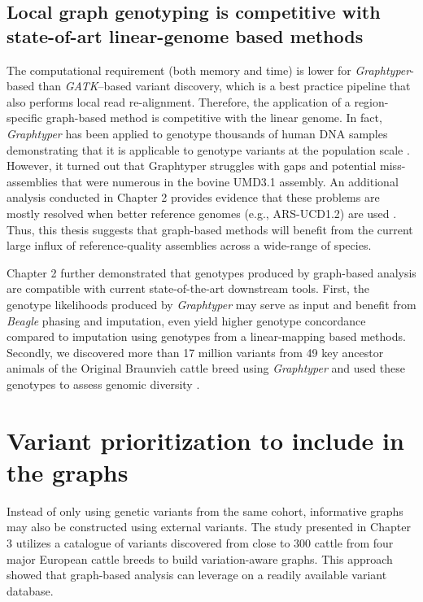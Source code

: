 \documentclass[../main.tex]{subfiles}
\begin{document}
\subsection*{Local graph genotyping is competitive with state-of-art linear-genome based methods}

The computational requirement (both memory and time) is lower for \emph{Graphtyper}-based than \emph{GATK}–based variant discovery, which is a best practice pipeline that also performs local read re-alignment. Therefore, the application of a region-specific graph-based method is competitive with the linear genome. In fact, \emph{Graphtyper} has been applied to genotype thousands of human DNA samples demonstrating that it is applicable to genotype variants at the population scale \citep{eggertsson2017graphtyper,eggertsson2019graphtyper2}. However, it turned out that Graphtyper struggles with gaps and potential miss-assemblies that were numerous in the bovine UMD3.1 assembly. An additional analysis conducted in Chapter 2 provides evidence that these problems are mostly resolved when better reference genomes (e.g., ARS-UCD1.2) are used \citep{rosen2020novo}. Thus, this thesis suggests that graph-based methods will benefit from the current large influx of reference-quality assemblies across a wide-range of species. 

Chapter 2 further demonstrated that genotypes produced by graph-based analysis are compatible with current state-of-the-art downstream tools. First, the genotype likelihoods produced by \emph{Graphtyper }may serve as input and benefit from \emph{Beagle} phasing and imputation, even yield higher genotype concordance compared to imputation using genotypes from a linear-mapping based methods. Secondly, we discovered more than 17 million variants from 49 key ancestor animals of the Original Braunvieh cattle breed using \emph{Graphtyper} and used these genotypes to assess genomic diversity \citep{bhati2020assessing}. 

\section{Variant prioritization to include in the graphs}

Instead of only using genetic variants from the same cohort, informative graphs may also be constructed using external variants. The study presented in Chapter 3 utilizes a catalogue of variants discovered from close to 300 cattle from four major European cattle breeds to build variation-aware graphs. This approach showed that graph-based analysis can leverage on a readily available variant database. 
\end{document}
